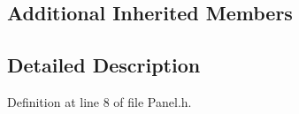 \subsection*{Additional Inherited Members}


\subsection{Detailed Description}


Definition at line 8 of file Panel.\+h.

